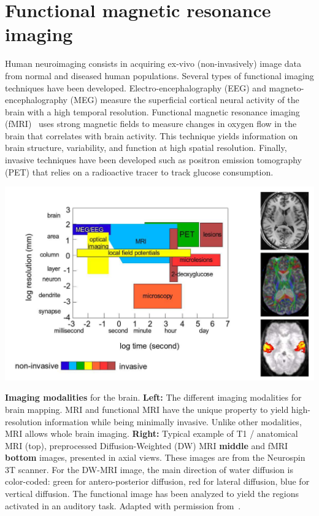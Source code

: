 \section{Functional magnetic resonance imaging}
\label{sec:fmri}
Human neuroimaging consists in acquiring ex-vivo
(non-invasively) image data from normal and
diseased human populations.
Several types of functional imaging techniques have been developed. Electro-encephalography (EEG) and magneto-encephalography (MEG) measure the superficial cortical neural activity of the brain with a high temporal resolution. Functional
magnetic resonance imaging (fMRI)~\citep{agawa1990,ogawa1990b} uses strong magnetic fields to measure changes in
oxygen flow in the brain that correlates with brain activity. This technique yields
information on brain structure, variability, and function at high
spatial resolution. Finally, invasive
techniques have been developed such as positron emission tomography (PET) that
relies on a radioactive tracer to track glucose consumption.

\begin{pagefigure}%
  \includegraphics[width=1\linewidth]{figures/modalities.png}
  \caption{\textbf{Imaging modalities} for the brain. \textbf{Left:} The different imaging modalities for brain mapping.
      MRI and functional MRI have
the unique property to yield high-resolution information while being minimally invasive. Unlike other
modalities, MRI allows whole brain imaging. \textbf{Right:} Typical example of T1 / anatomical MRI (top), preprocessed Diffusion-Weighted (DW) MRI \textbf{middle} and fMRI \textbf{bottom} images, presented in axial views.
These images are from the Neurospin 3T scanner. For the DW-MRI image,
the main direction of water diffusion is color-coded: green for antero-posterior diffusion, red for lateral
diffusion, blue for vertical diffusion. The functional image has been analyzed to yield the regions activated
in an auditory task. Adapted with permission from~\citep{thirion_hdr}.}
\end{pagefigure}

